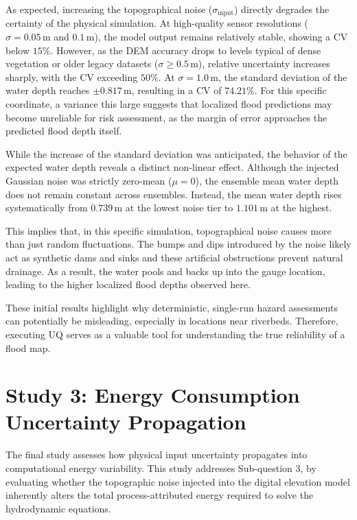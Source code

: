 As expected, increasing the topographical noise ($\sigma_{\text{input}}$) directly degrades the certainty of the physical simulation. At high-quality sensor resolutions ($\sigma = 0.05\,\text{m}$ and $0.1\,\text{m}$), the model output remains relatively stable, showing a CV below $15\%$. However, as the DEM accuracy drops to levels typical of dense vegetation or older legacy datasets ($\sigma \ge 0.5\,\text{m}$), relative uncertainty increases sharply, with the CV exceeding $50\%$. At $\sigma = 1.0\,\text{m}$, the standard deviation of the water depth reaches $\pm 0.817\,\text{m}$, resulting in a CV of $74.21\%$. For this specific coordinate, a variance this large suggests that localized flood predictions may become unreliable for risk assessment, as the margin of error approaches the predicted flood depth itself.

While the increase of the standard deviation was anticipated, the behavior of the expected water depth reveals a distinct non-linear effect. Although the injected Gaussian noise was strictly zero-mean ($\mu = 0$), the ensemble mean water depth does not remain constant across ensembles. Instead, the mean water depth rises systematically from $0.739\,\text{m}$ at the lowest noise tier to $1.101\,\text{m}$ at the highest.

This implies that, in this specific simulation, topographical noise causes more than just random fluctuations. The bumps and dips introduced by the noise likely act as synthetic dams and sinks and these artificial obstructions prevent natural drainage. As a result, the water pools and backs up into the gauge location, leading to the higher localized flood depths observed here.

These initial results highlight why deterministic, single-run hazard assessments can potentially be misleading, especially in locations near riverbeds. Therefore, executing UQ serves as a valuable tool for understanding the true reliability of a flood map.




\section{Study 3: Energy Consumption Uncertainty Propagation}
\label{sec:res-study3}

The final study assesses how physical input uncertainty propagates into computational energy variability. This study addresses Sub-question 3, by evaluating whether the topographic noise injected into the digital elevation model inherently alters the total process-attributed energy required to solve the hydrodynamic equations.


